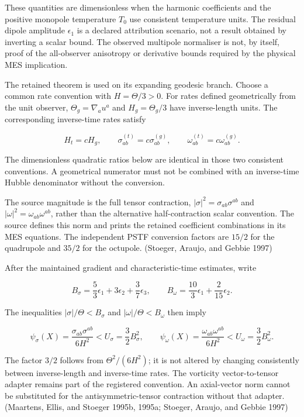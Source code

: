 \documentclass[
  11pt,
  a4paper]{article}
\begin{document}
These quantities are dimensionless when the harmonic coefficients and the
positive monopole temperature \(T_0\) use consistent temperature units. The
residual dipole amplitude \(\epsilon_1\) is a declared attribution scenario,
not a result obtained by inverting a scalar bound. The observed multipole
normaliser is not, by itself, proof of the all-observer anisotropy or derivative
bounds required by the physical MES implication.

The retained theorem is used on its expanding geodesic branch. Choose a common
rate convention with \(H=\Theta/3>0\). For rates defined geometrically from
the unit observer, \(\Theta_g=\nabla_a u^a\) and \(H_g=\Theta_g/3\) have
inverse-length units. The corresponding inverse-time rates satisfy

\[
H_t=cH_g,\qquad \sigma^{(t)}_{ab}=c\sigma^{(g)}_{ab},
\qquad \omega^{(t)}_{ab}=c\omega^{(g)}_{ab}.
\]

The dimensionless quadratic ratios below are identical in those two consistent
conventions. A geometrical numerator must not be combined with an
inverse-time Hubble denominator without the conversion.

The source magnitude is the full tensor contraction,
\(|\sigma|^2=\sigma_{ab}\sigma^{ab}\) and
\(|\omega|^2=\omega_{ab}\omega^{ab}\), rather than the alternative
half-contraction scalar convention. The source defines this norm and prints
the retained coefficient combinations in its MES equations. The independent
PSTF conversion factors are \(15/2\) for the quadrupole and \(35/2\) for the
octupole. (Stoeger, Araujo, and Gebbie 1997)

After the maintained gradient and characteristic-time estimates, write

\[
B_\sigma=\frac53\epsilon_1+3\epsilon_2+\frac37\epsilon_3,
\qquad
B_\omega=\frac{10}{3}\epsilon_1+\frac{2}{15}\epsilon_2.
\]

The inequalities \(|\sigma|/\Theta<B_\sigma\) and
\(|\omega|/\Theta<B_\omega\) then imply

\[
\psi_\sigma(X)=\frac{\sigma_{ab}\sigma^{ab}}{6H^2}
<U_\sigma=\frac32B_\sigma^2,
\qquad
\psi_\omega(X)=\frac{\omega_{ab}\omega^{ab}}{6H^2}
<U_\omega=\frac32B_\omega^2.
\]

The factor \(3/2\) follows from \(\Theta^2/(6H^2)\); it is not altered by
changing consistently between inverse-length and inverse-time rates. The
vorticity vector-to-tensor adapter remains part of the registered convention.
An axial-vector norm cannot be substituted for the antisymmetric-tensor
contraction without that adapter. (Maartens, Ellis, and Stoeger 1995b, 1995a; Stoeger, Araujo, and Gebbie 1997)
\end{document}
